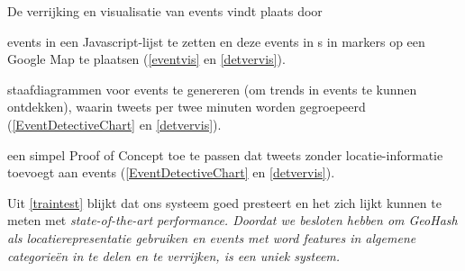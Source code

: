 {{De verrijking en visualisatie van events vindt plaats door

\begin{bullets}
\item events in een Javascript-lijst te zetten en deze events in s in markers op een Google Map te plaatsen (\ref{eventvis}
en \ref{detvervis}).
\item staafdiagrammen voor events te genereren (om trends in events te kunnen ontdekken), waarin tweets per twee minuten worden gegroepeerd
(\ref{EventDetectiveChart} en \ref{detvervis}).
\item een simpel Proof of Concept toe te passen dat tweets zonder locatie-informatie toevoegt aan events (\ref{EventDetectiveChart} en
\ref{detvervis}).
\end{bullets}

Uit \ref{traintest} blijkt dat ons systeem goed presteert en het zich lijkt kunnen te meten met \it{state-of-the-art performance}. Doordat we 
besloten hebben om GeoHash als locatierepresentatie gebruiken en events met word features in algemene categorie\"en in te delen 
en te verrijken, is  een uniek systeem.
\newpage
{}\label{bijlage}

\captionsetup{hypcap=false}

}}
